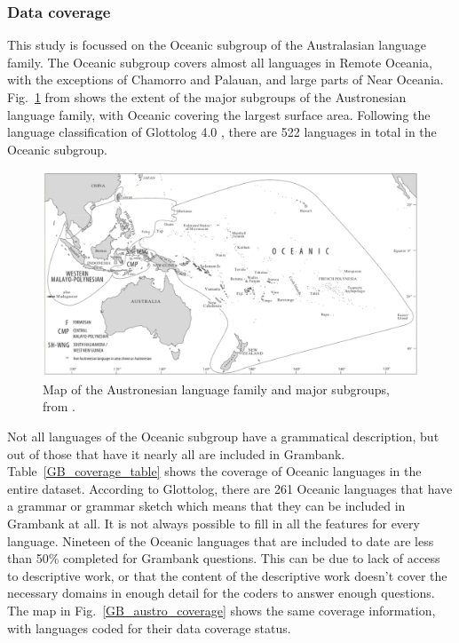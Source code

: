 \documentclass[a4paper,10pt]{article} %
\begin{document}
\subsubsection{Data coverage} 
This study is focussed on the Oceanic subgroup of the Australasian language family. The Oceanic subgroup covers almost all languages in Remote Oceania, with the exceptions of Chamorro and Palauan, and large parts of Near Oceania. Fig.~\ref{Oceanic_map} from \citet[2]{protooceanicvol5} shows the extent of the major subgroups of the Austronesian language family, with Oceanic covering the largest surface area. Following the language classification of Glottolog 4.0 \citep{glottolog40}, there are 522 languages in total in the Oceanic subgroup.

\begin{figure}[h]
\centering
\includegraphics[width=\textwidth]{illustrations/ross_pawley_osmond_protooceanic_vol5.png}
\caption{{Map of the Austronesian language family and major subgroups, from \citet[2]{protooceanicvol5}.}}
\label{Oceanic_map}
\end{figure} 

Not all languages of the Oceanic subgroup have a grammatical description, but out of those that have it nearly all are included in Grambank. Table~\ref{GB_coverage_table} shows the coverage of Oceanic languages in the entire dataset. According to Glottolog, there are 261 Oceanic languages that have a grammar or grammar sketch which means that they can be included in Grambank at all. It is not always possible to fill in all the features for every language. Nineteen of the Oceanic languages that are included to date are less than 50\% completed for Grambank questions. This can be due to lack of access to descriptive work, or that the content of the descriptive work doesn't cover the necessary domains in enough detail for the coders to answer enough questions. The map in Fig.~\ref{GB_austro_coverage} shows the same coverage information, with languages coded for their data coverage status.
\end{document}
